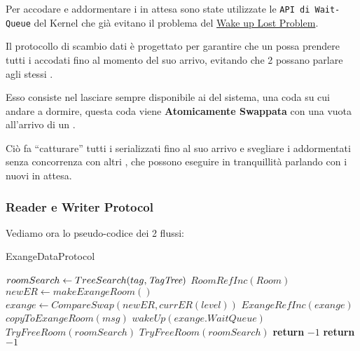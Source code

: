 Per accodare e addormentare i \Reader in attesa sono state utilizzate le  \texttt{API di Wait-Queue} del Kernel che già
evitano il problema del \underline{Wake up Lost Problem}.

Il protocollo di scambio dati è progettato per garantire che un \Writer possa prendere tutti i \Reader accodati fino al
momento del suo arrivo, evitando che 2 \Writer possano parlare agli stessi \Reader.

Esso consiste nel lasciare sempre disponibile ai \Reader del sistema, una coda su cui andare a dormire, questa coda
viene \textbf{Atomicamente Swappata}  con una vuota all'arrivo di un \Writer.

Ciò fa ``catturare'' tutti i \Reader serializzati fino al suo arrivo e svegliare i \Reader addormentati senza
concorrenza con altri \Writer, che possono eseguire in tranquillità parlando con i nuovi \Reader in attesa.


\subsubsection{Reader e Writer Protocol}
Vediamo ora lo pseudo-codice dei 2 flussi:

\begin{algorithm}
\caption{\Writer ExangeDataProtocol}\label{writeExange}
\begin{algorithmic}[1]
\State $roomSearch \gets TreeSearch(tag, \textit{TagTree})$
    \State $RoomRefInc(Room)$
        \State $newER \gets makeExangeRoom()$ 
        \State $exange \gets CompareSwap(newER, currER(level))$
        \State $ExangeRefInc(exange)$
        \State $copyToExangeRoom(msg)$
        \State $wakeUp(exange.WaitQueue)$
        \State $TryFreeRoom(roomSearch)$
    \Else
        \State $TryFreeRoom(roomSearch)$
        \State \textbf{return} $-1$
    \EndIf
\Else
    \State \textbf{return} $-1$

\EndIf
\EndProcedure
\end{algorithmic}
\end{algorithm}

\newpage

